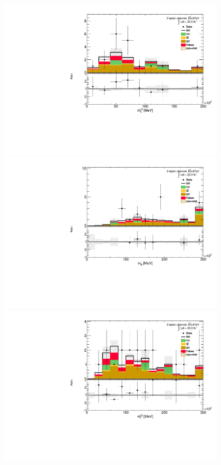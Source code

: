 \begin{figure}[!htbp]
  \begin{minipage}[h]{0.5\textwidth}
    \centering \includegraphics[width=\textwidth]{figs/results/plotCand_3lep_Mll01}
  \end{minipage}\hfill
  \begin{minipage}[h]{0.5\textwidth}
    \centering \includegraphics[width=\textwidth]{figs/results/plotCand_3lep_Mlll}
  \end{minipage}\hfill
  \begin{minipage}[h]{0.5\textwidth}
    \centering \includegraphics[width=\textwidth]{figs/results/plotCand_3lep_Mll02}

\end{minipage}
\end{figure}
